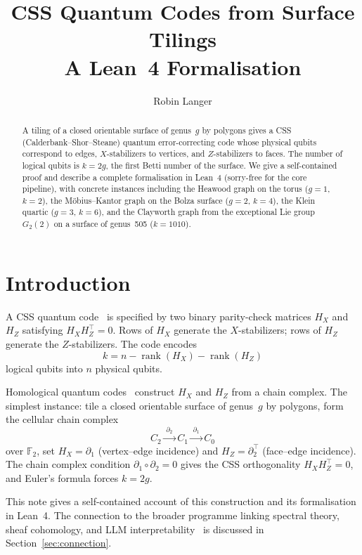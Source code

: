 \documentclass[11pt,a4paper]{article}
\title{\textbf{CSS Quantum Codes from Surface Tilings}\\[4pt]
\large A Lean~4 Formalisation}
\author{Robin Langer}
\date{}
\newcommand{\FF}{\mathbb{F}_2}
\begin{document}
\maketitle

\begin{abstract}
A tiling of a closed orientable surface of genus~$g$ by polygons gives a
CSS (Calderbank--Shor--Steane) quantum error-correcting code whose physical
qubits correspond to edges, $X$-stabilizers to vertices, and $Z$-stabilizers
to faces. The number of logical qubits is $k = 2g$, the first Betti number
of the surface. We give a self-contained proof and describe a complete
formalisation in Lean~4 (sorry-free for the core pipeline), with concrete
instances including the Heawood graph on the torus ($g=1$, $k=2$), the
M\"obius--Kantor graph on the Bolza surface ($g=2$, $k=4$), the Klein
quartic ($g=3$, $k=6$), and the Clayworth graph from the exceptional Lie
group $G_2(2)$ on a surface of genus~505 ($k=1010$).
\end{abstract}


\section{Introduction}

A CSS quantum code~\cite{calderbank_shor1996,steane1996} is specified by two
binary parity-check matrices $H_X$ and $H_Z$ satisfying $H_X H_Z^\top = 0$.
Rows of $H_X$ generate the $X$-stabilizers; rows of $H_Z$ generate the
$Z$-stabilizers. The code encodes
\[
  k = n - \operatorname{rank}(H_X) - \operatorname{rank}(H_Z)
\]
logical qubits into $n$ physical qubits.

Homological quantum codes~\cite{breuckmann_terhal2017} construct $H_X$ and
$H_Z$ from a chain complex. The simplest instance: tile a closed orientable
surface of genus~$g$ by polygons, form the cellular chain complex
\[
  C_2 \xrightarrow{\;\partial_2\;} C_1 \xrightarrow{\;\partial_1\;} C_0
\]
over $\FF$, set $H_X = \partial_1$ (vertex--edge incidence) and
$H_Z = \partial_2^\top$ (face--edge incidence). The chain complex condition
$\partial_1 \circ \partial_2 = 0$ gives the CSS orthogonality
$H_X H_Z^\top = 0$, and Euler's formula forces
$k = 2g$.

This note gives a self-contained account of this construction and its
formalisation in Lean~4. The connection to the broader programme linking
spectral theory, sheaf cohomology, and LLM
interpretability~\cite{langer2026llm,langer2026hurwitz} is discussed in
Section~\ref{sec:connection}.
\end{document}
